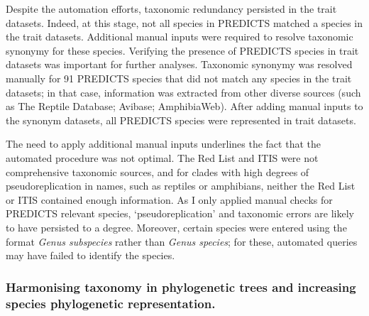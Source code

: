Despite the automation efforts, taxonomic redundancy persisted in the trait datasets. Indeed, at this stage, not all species in PREDICTS matched a species in the trait datasets. Additional manual inputs were required to resolve taxonomic synonymy for these species. Verifying the presence of PREDICTS species in trait datasets was important for further analyses. Taxonomic synonymy was resolved manually for 91 PREDICTS species that did not match any species in the trait datasets; in that case, information was extracted from other diverse sources (such as The Reptile Database; Avibase; AmphibiaWeb). After adding manual inputs to the synonym datasets, all PREDICTS species were represented in trait datasets. 

The need to apply additional manual inputs underlines the fact that the automated procedure was not optimal. The Red List and ITIS were not comprehensive taxonomic sources, and for clades with high degrees of pseudoreplication in names, such as reptiles or amphibians, neither the Red List or ITIS contained enough information. As I only applied manual checks for PREDICTS relevant species, `pseudoreplication' and taxonomic errors are likely to have persisted to a degree. Moreover, certain species were entered using the format \textit{Genus subspecies} rather than \textit{Genus species}; for these, automated queries may have failed to identify the species.



\subsubsection{Harmonising taxonomy in phylogenetic trees and increasing species phylogenetic representation.}

